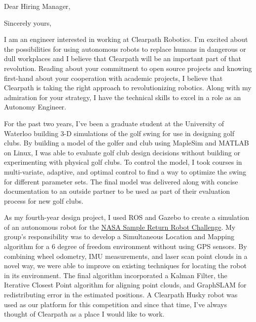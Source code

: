 \documentclass[11pt,a4paper,sans]{moderncv} %
\begin{document}
\clearpage

\date{\today} %
\opening{Dear Hiring Manager,} %
\closing{Sincerely yours,} %

\makelettertitle %

I am an engineer interested in working at Clearpath Robotics. I'm excited about the possibilities for using autonomous robots to replace humans in dangerous or dull workplaces and I believe that Clearpath will be an important part of that revolution. Reading about your commitment to open source projects and knowing first-hand about your cooperation with academic projects, I believe that Clearpath is taking the right approach to revolutionizing robotics. Along with my admiration for your strategy, I have the technical skills to excel in a role as an Autonomy Engineer.

For the past two years, I've been a graduate student at the University of Waterloo building 3-D simulations of the golf swing for use in designing golf clubs. By building a model of the golfer and club using MapleSim and MATLAB on Linux, I was able to evaluate golf club design decisions without building or experimenting with physical golf clubs. To control the model, I took courses in multi-variate, adaptive, and optimal control to find a way to optimize the swing for different parameter sets. The final model was delivered along with concise documentation to an outside partner to be used as part of their evaluation process for new golf clubs.

As my fourth-year design project, I used ROS and Gazebo to create a simulation of an autonomous robot for the \href{http://www.nasa.gov/directorates/spacetech/centennial_challenges/sample_return_robot/index.html}{NASA Sample Return Robot Challenge}. My group's responsibility was to develop a Simultaneous Location and Mapping algorithm for a 6 degree of freedom environment without using GPS sensors. By combining wheel odometry, IMU measurements, and laser scan point clouds in a novel way, we were able to improve on existing techniques for locating the robot in its environment. The final algorithm incorporated a Kalman Filter, the Iterative Closest Point algorithm for aligning point clouds, and GraphSLAM for redistributing error in the estimated positions. A Clearpath Husky robot was used as our platform for this competition and since that time, I've always thought of Clearpath as a place I would like to work.
\end{document}
